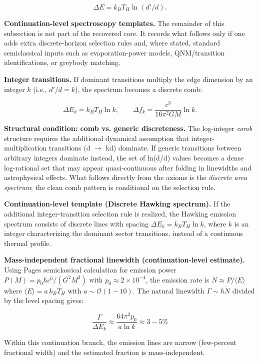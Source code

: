 \[
\Delta E = k_B T_H \ln(d'/d).
\]

\textbf{Continuation-level spectroscopy templates.} The remainder of this subsection is not part of the recovered core. It records what follows only if one adds extra discrete-horizon selection rules and, where stated, standard semiclassical inputs such as evaporation-power models, QNM/transition identifications, or greybody matching.

\textbf{Integer transitions.} If dominant transitions multiply the edge dimension by an integer \(k\) (i.e., \(d'/d = k\)), the spectrum becomes a discrete comb:

\[
\Delta E_k = k_B T_H \ln k, \qquad
\Delta f_k = \frac{c^3}{16\pi^2 G M} \ln k.
\]

\textbf{Structural condition: comb vs. generic discreteness.} The log-integer \emph{comb} structure requires the additional dynamical assumption that integer-multiplication transitions (d \ensuremath{\to} kd) dominate. If generic transitions between arbitrary integers dominate instead, the set of ln(d\textquotesingle/d) values becomes a dense log-rational set that may appear quasi-continuous after folding in linewidths and astrophysical effects. What follows directly from the axioms is the \emph{discrete area spectrum}; the clean comb pattern is conditional on the selection rule.

\textbf{Continuation-level template (Discrete Hawking spectrum).} If the additional integer-transition selection rule is realized, the Hawking emission spectrum consists of discrete lines with spacing \(\Delta E_k = k_B T_H \ln k\), where \(k\) is an integer characterizing the dominant sector transitions, instead of a continuous thermal profile.

\textbf{Mass-independent fractional linewidth (continuation-level estimate).} Using Page\textquotesingle s semiclassical calculation for emission power \(P(M) = p_0 \hbar c^6 / (G^2 M^2)\) with \(p_0 \approx 2 \times 10^{-4}\), the emission rate is \(\dot{N} \approx P /
\langle E \rangle\) where \(\langle E \rangle = a \, k_B T_H\) with \(a \sim
\mathcal{O}(1-10)\). The natural linewidth \(\Gamma \sim \hbar \dot{N}\) divided by the level spacing gives:

\[
\frac{\Gamma}{\Delta E_k} \approx \frac{64\pi^2 p_0}{a \ln k} \approx 3-5\%
\]

Within this continuation branch, the emission lines are narrow (few-percent fractional width) and the estimated fraction is mass-independent.

